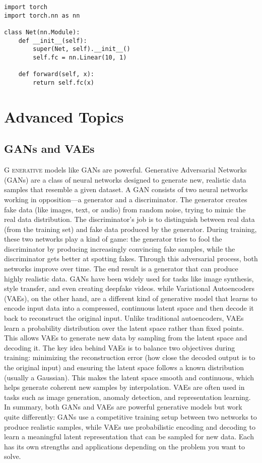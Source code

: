 \documentclass{book}
\begin{document}
\begin{lstlisting}[style=mystyle, caption={A simple neural net in PyTorch}]
import torch
import torch.nn as nn

class Net(nn.Module):
    def __init__(self):
        super(Net, self).__init__()
        self.fc = nn.Linear(10, 1)

    def forward(self, x):
        return self.fc(x)
\end{lstlisting}

\chapter{Advanced Topics}

\section{GANs and VAEs}
\lettrine{G}{ enerative} models like GANs are powerful. Generative Adversarial Networks (GANs) are a class of neural networks designed to generate new, realistic data samples that resemble a given dataset. A GAN consists of two neural networks working in opposition—a generator and a discriminator. The generator creates fake data (like images, text, or audio) from random noise, trying to mimic the real data distribution. The discriminator’s job is to distinguish between real data (from the training set) and fake data produced by the generator. During training, these two networks play a kind of game: the generator tries to fool the discriminator by producing increasingly convincing fake samples, while the discriminator gets better at spotting fakes. Through this adversarial process, both networks improve over time. The end result is a generator that can produce highly realistic data. GANs have been widely used for tasks like image synthesis, style transfer, and even creating deepfake videos.
while Variational Autoencoders (VAEs), on the other hand, are a different kind of generative model that learns to encode input data into a compressed, continuous latent space and then decode it back to reconstruct the original input. Unlike traditional autoencoders, VAEs learn a probability distribution over the latent space rather than fixed points. This allows VAEs to generate new data by sampling from the latent space and decoding it. The key idea behind VAEs is to balance two objectives during training: minimizing the reconstruction error (how close the decoded output is to the original input) and ensuring the latent space follows a known distribution (usually a Gaussian). This makes the latent space smooth and continuous, which helps generate coherent new samples by interpolation. VAEs are often used in tasks such as image generation, anomaly detection, and representation learning. In summary, both GANs and VAEs are powerful generative models but work quite differently: GANs use a competitive training setup between two networks to produce realistic samples, while VAEs use probabilistic encoding and decoding to learn a meaningful latent representation that can be sampled for new data. Each has its own strengths and applications depending on the problem you want to solve.
\end{document}
